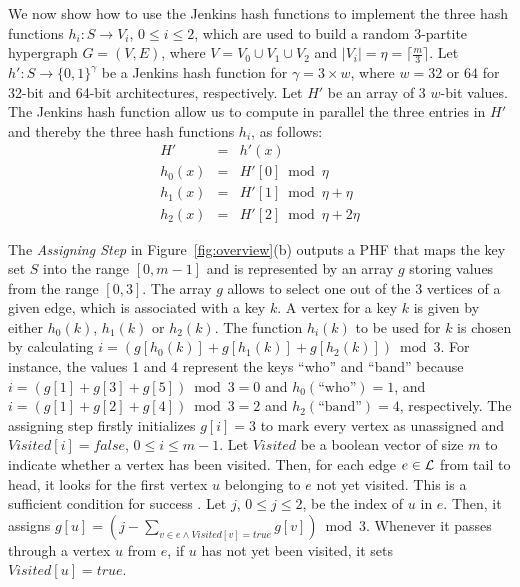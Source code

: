 We now show how to use the Jenkins hash functions \cite{j97}
to implement the three hash functions $h_i: S \to V_i$, $0\le i \le 2$, which are used to build a random $3$-partite hypergraph
$G=(V,E)$,
where $V= V_0 \cup V_1 \cup V_2$ and $|V_i| = \eta = \lceil \frac{m}{3} \rceil$.
Let $h':S \to \{0,1\}^\gamma$ be a Jenkins hash function
for $\gamma = 3 \times w$, where
$w = 32 \text{ or } 64$ for
32-bit and 64-bit architectures, respectively. 
Let $H'$ be an array of 3 $w$-bit values.
The Jenkins hash function
allow us to compute in parallel the three entries in $H'$
and thereby the three hash functions $h_i$, as follows:
\begin{eqnarray}
 H' &=& h'(x) \nonumber \\
 h_0(x) &=& H'[0] \bmod \eta \nonumber \\
 h_1(x) &=& H'[1] \bmod \eta + \eta \nonumber \\
 h_2(x) &=& H'[2] \bmod \eta + 2\eta
\end{eqnarray}

The {\em Assigning Step} in Figure~\ref{fig:overview}(b) outputs 
a PHF that maps the key set $S$ into the range $[0,m-1]$ and is represented by
an array $g$ storing values from the range $[0,3]$.
The array $g$ allows to select one out of the $3$
vertices of a given edge, which is associated with a 
key $k$.
A vertex for a key $k$ is given
by either $h_0(k)$, $h_1(k)$ or $h_2(k)$.
The function $h_i(k)$ 
to be used for $k$ is chosen by calculating $i = (g[h_0(k)] + g[h_1(k)] + g[h_2(k)]) \bmod 3$.
For instance,
the values 1 and 4 represent the keys ``who'' and ``band'' 
because $i = (g[1] + g[3] + g[5]) \bmod 3 = 0$ and $h_0(\text{``who''}) = 1$,
and $i = (g[1] + g[2] + g[4]) \bmod 3 = 2$ and $h_2(\text{``band''}) = 4$, respectively.
The assigning step firstly initializes $g[i]=3$
to mark every vertex as unassigned  
and
$\mathit{Visited}[i]=\mathit{false}$, $0\leq i \leq m-1$.
Let $\mathit{Visited}$ be a boolean vector of size $m$
to indicate whether a vertex has been visited.
Then, for each edge $e \in \cal L$ from tail to head, 
it looks for the first
vertex $u$ belonging to $e$ not yet visited. 
This is a sufficient condition for success \cite{b08,bpz07,mwhc96}.
Let $j$, $0 \leq j \leq 2$, be the index of $u$ in $e$. 
Then, it assigns $g[u]=(j-\sum_{v \in e \wedge \mathit{Visited}[v] = true} g[v]) \bmod 3$. 
Whenever it passes through a vertex $u$ from $e$, 
if $u$ has not yet been visited,
it sets $\mathit{Visited}[u] = true$.

